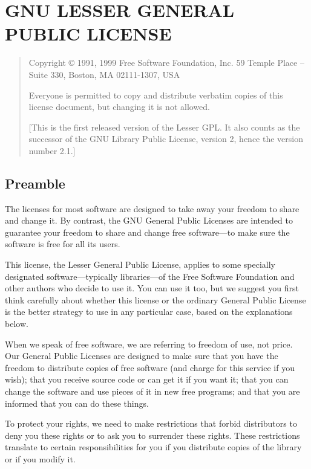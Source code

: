 \chapter{GNU LESSER GENERAL PUBLIC LICENSE}
\subtitle{Version 2.1, February 1999}
\label{lgpl}


\begin{quote}
Copyright \copyright{} 1991, 1999 Free Software Foundation, Inc.
59 Temple Place -- Suite 330, Boston, MA 02111-1307, USA

Everyone is permitted to copy and distribute verbatim copies
of this license document, but changing it is not allowed.

[This is the first released version of the Lesser GPL.  It also counts
as the successor of the GNU Library Public License, version 2, hence the
version number 2.1.]
\end{quote}

\section{Preamble}
  The licenses for most software are designed to take away your
freedom to share and change it.  By contrast, the GNU General Public
Licenses are intended to guarantee your freedom to share and change
free software---to make sure the software is free for all its users.

  This license, the Lesser General Public License, applies to some
specially designated software---typically libraries---of the Free
Software Foundation and other authors who decide to use it.  You can use
it too, but we suggest you first think carefully about whether this
license or the ordinary General Public License is the better strategy to
use in any particular case, based on the explanations below.

  When we speak of free software, we are referring to freedom of use,
not price.  Our General Public Licenses are designed to make sure that
you have the freedom to distribute copies of free software (and charge
for this service if you wish); that you receive source code or can get
it if you want it; that you can change the software and use pieces of it
in new free programs; and that you are informed that you can do these
things.

  To protect your rights, we need to make restrictions that forbid
distributors to deny you these rights or to ask you to surrender these
rights.  These restrictions translate to certain responsibilities for
you if you distribute copies of the library or if you modify it.

